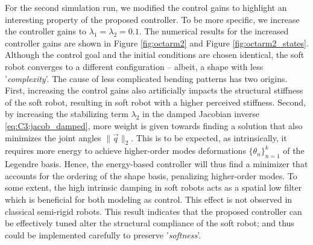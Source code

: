 \begin{example}
For the second simulation run, we modified the control gains to highlight an interesting property of the proposed controller. To be more specific, we increase the controller gains to $\lambda_1 = \lambda_2 = 0.1$. The numerical results for the increased controller gains are shown in Figure \ref{fig:octarm2} and Figure \ref{fig:octarm2_states}. Although the control goal and the initial conditions are chosen identical, the soft robot converges to a different configuration -- albeit, a shape with less '\textit{complexity}'. The cause of less complicated bending patterns has two origins. First, increasing the control gains also artificially impacts the structural stiffness of the soft robot, resulting in soft robot with a higher perceived stiffness. Second, by increasing the stabilizing term $\lambda_2$ in the damped Jacobian inverse \eqref{eq:C3:jacob_damped}, more weight is given towards finding a solution that also minimizes the joint angles $\lVert \vec{q} \rVert_2 $.  This is to be expected, as intrinsically, it requires more energy to achieve higher-order modes deformations $\{\theta_n\}_{n=1}^k$ of the Legendre basis. Hence, the energy-based controller will thus find a minimizer that accounts for the ordering of the shape basis, penalizing higher-order modes. To some extent, the high intrinsic damping in soft robots acts as a spatial low filter which is beneficial for both modeling as control. This effect is not observed in classical semi-rigid robots.  This result indicates that the proposed controller can be effectively tuned alter the structural compliance of the soft robot; and thus could be implemented carefully to preserve '\textit{softness}'. 

\end{example}

